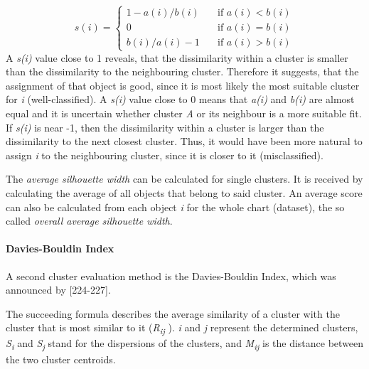   \[ s(i) =
  \begin{cases}
    1 - a(i)/b(i)       & \quad \text{if } a(i) < b(i)\\
    0       & \quad \text{if } a(i) = b(i)\\
 b(i)/a(i) - 1      & \quad \text{if } a(i) > b(i)

  \end{cases}
\]
A \textit{s(i)} value close to 1 reveals, that the dissimilarity within a cluster is smaller than the dissimilarity to the neighbouring cluster. Therefore it suggests, that the assignment of that object is good, since it is most likely the most suitable cluster for \textit{i} (well-classified). A \textit{s(i)} value close to 0 means that \textit{a(i)} and \textit{b(i)} are almost equal and it is uncertain whether cluster \textit{A} or its neighbour is a more suitable fit. If \textit{s(i)} is near -1, then the dissimilarity within a cluster is larger than the dissimilarity to the next closest cluster. Thus, it would have been more natural to assign \textit{i} to the neighbouring cluster, since it is closer to it (misclassified).

The \textit{average silhouette width} can be calculated for single clusters. It is received by calculating the average of all objects that belong to said cluster. An average score can also be calculated from each object \textit{i} for the whole chart (dataset), the so called \textit{overall average silhouette width}. 





\paragraph{Davies-Bouldin Index}
A second cluster evaluation method is the Davies-Bouldin Index, which was announced by \textcite{DaviesBouldin}[224-227]. 

The succeeding formula describes the average similarity of a cluster with the cluster that is most similar to it (\textit{R\textsubscript{ij}} ).
\textit{i} and \textit{j} represent the determined clusters, \textit{S\textsubscript{i}} and \textit{S\textsubscript{j}} stand for the dispersions of the clusters, and \textit{M\textsubscript{ij}} is the distance between the two cluster centroids. 

